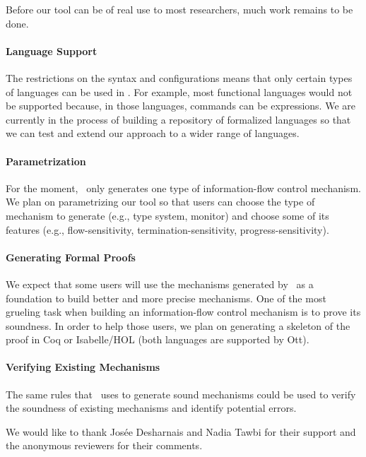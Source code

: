 \documentclass[sigplan,10pt]{acmart}\settopmatter{printfolios=true,printccs=false,printacmref=false}
\begin{document}
Before our tool can be of real use to most researchers, much work remains to be done.

\paragraph{Language Support} The restrictions on the syntax and configurations means that only certain types of languages can be used in \ottifc. For example, most functional languages would not be supported because, in those languages, commands can be expressions. We are currently in the process of building a repository of formalized languages so that we can test and extend our approach to a wider range of languages.

\paragraph{Parametrization} For the moment, \ottifc\ only generates one type of information-flow control mechanism. We plan on parametrizing our tool so that users can choose the type of mechanism to generate (e.g., type system, monitor) and choose some of its features (e.g., flow-sensitivity, termination-sensitivity, progress-sensitivity).

\paragraph{Generating Formal Proofs} We expect that some users will use the mechanisms generated by \ottifc\ as a foundation to build better and more precise mechanisms. One of the most grueling task when building an information-flow control mechanism is to prove its soundness. In order to help those users, we plan on generating a skeleton of the proof in Coq or Isabelle/HOL (both languages are supported by Ott).

\paragraph{Verifying Existing Mechanisms} The same rules that \ottifc\ uses to generate sound mechanisms could be used to verify the soundness of existing mechanisms and identify potential errors.

\begin{acks}
We would like to thank Josée Desharnais and Nadia Tawbi for their support and the anonymous reviewers for their comments.
\end{acks}


\end{document}
